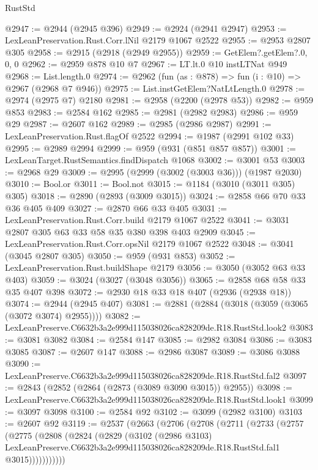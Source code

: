 \begin{lexlean}{RustStd}
\begin{coremodule}
@2947 := @2944 (@2945 @396)
@2949 := @2924 (@2941 @2947)
@2953 := LexLeanPreservation.Rust.Corr.lNil @2179 @1067 @2522
@2955 := @2953 @2807 @305
@2958 := @2915 (@2918 (@2949 @2955))
@2959 := GetElem?.getElem?.{0, 0, 0}
@2962 := @2959 @878 @10 @7
@2967 := LT.lt.{0} @10 instLTNat @949
@2968 := List.length.{0}
@2974 := @2962 (fun (as : @878) => fun (i : @10) => @2967 (@2968 @7 @946))
@2975 := List.instGetElem?NatLtLength.{0}
@2978 := @2974 (@2975 @7) @2180
@2981 := @2958 (@2200 (@2978 @53))
@2982 := @959 @853
@2983 := @2584 @162
@2985 := @2981 (@2982 @2983)
@2986 := @959 @29
@2987 := @2607 @162
@2989 := @2985 (@2986 @2987)
@2991 := LexLeanPreservation.Rust.flagOf @2522
@2994 := @1987 (@2991 @102 @33)
@2995 := @2989 @2994
@2999 := @959 (@931 (@851 @857 @857))
@3001 := LexLeanTarget.RustSemantics.findDispatch @1068
@3002 := @3001 @53
@3003 := @2968 @29
@3009 := @2995 (@2999 (@3002 (@3003 @36))) (@1987 @2030)
@3010 := Bool.or
@3011 := Bool.not
@3015 := @1184 (@3010 (@3011 @305) @305)
@3018 := @2890 (@2893 (@3009 @3015))
@3024 := @2858 @66 @70 @33 @36 @405 @409
@3027 := @2870 @66 @33 @405
@3031 := LexLeanPreservation.Rust.Corr.build @2179 @1067 @2522
@3041 := @3031 @2807 @305 @63 @33 @58 @35 @380 @398 @403 @2909
@3045 := LexLeanPreservation.Rust.Corr.opsNil @2179 @1067 @2522
@3048 := @3041 (@3045 @2807 @305)
@3050 := @959 (@931 @853)
@3052 := LexLeanPreservation.Rust.buildShape @2179
@3056 := @3050 (@3052 @63 @33 @403)
@3059 := @3024 (@3027 (@3048 @3056))
@3065 := @2858 @68 @58 @33 @35 @407 @398
@3072 := @2930 @18 @33 @18 @407 (@2936 (@2938 @18))
@3074 := @2944 (@2945 @407)
@3081 := @2881 (@2884 (@3018 (@3059 (@3065 (@3072 @3074) @2955))))
@3082 := LexLeanPreserve.C6632b3a2e999d115038026ca828209de.R18.RustStd.look2
@3083 := @3081 @3082
@3084 := @2584 @147
@3085 := @2982 @3084
@3086 := @3083 @3085
@3087 := @2607 @147
@3088 := @2986 @3087
@3089 := @3086 @3088
@3090 := LexLeanPreserve.C6632b3a2e999d115038026ca828209de.R18.RustStd.fal2
@3097 := @2843 (@2852 (@2864 (@2873 (@3089 @3090 @3015)) @2955))
@3098 := LexLeanPreserve.C6632b3a2e999d115038026ca828209de.R18.RustStd.look1
@3099 := @3097 @3098
@3100 := @2584 @92
@3102 := @3099 (@2982 @3100)
@3103 := @2607 @92
@3119 := @2537
    (@2663
      (@2706
        (@2708
          (@2711
            (@2733
              (@2757
                (@2775
                  (@2808
                    (@2824
                      (@2829
                        (@3102
                          (@2986 @3103)
                          LexLeanPreserve.C6632b3a2e999d115038026ca828209de.R18.RustStd.fal1
                          @3015)))))))))))

\end{coremodule}
\end{lexlean}
